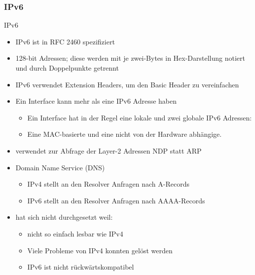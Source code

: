 \subsubsection{IPv6}

\begin{definition}{IPv6}
    \begin{itemize}
        \item IPv6 ist in RFC 2460 spezifiziert
        \item 128-bit Adressen; diese werden mit je zwei-Bytes in Hex-Darstellung notiert und durch Doppelpunkte getrennt
        \item IPv6 verwendet Extension Headers, um den Basic Header zu vereinfachen
        \item Ein Interface kann mehr als eine IPv6 Adresse haben
        \begin{itemize}
            \item Ein Interface hat in der Regel eine lokale und zwei globale IPv6 Adressen:
            \item Eine MAC-basierte und eine nicht von der Hardware abhängige.
        \end{itemize}
        \item verwendet zur Abfrage der Layer-2 Adressen NDP statt ARP
        \item Domain Name Service (DNS)
        \begin{itemize}
            \item IPv4 stellt an den Resolver Anfragen nach A-Records
            \item IPv6 stellt an den Resolver Anfragen nach AAAA-Records
        \end{itemize}
        \item hat sich nicht durchgesetzt weil:
        \begin{itemize}
            \item nicht so einfach lesbar wie IPv4
            \item Viele Probleme von IPv4 konnten gelöst werden
            \item IPv6 ist nicht rückwärtskompatibel
        \end{itemize}
    \end{itemize}
    
\end{definition}


